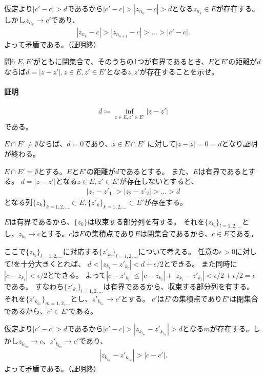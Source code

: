 仮定より$|c'-c|>d$であるから$|c'-c|>|z_{n_k}-c|>d$となる$z_{n_k}\in E$が存在する。しかし$z_{n_k}\longrightarrow c'$であり、
\begin{align*}
    |z_{n_k}-c|>|z_{n_{k+1}}-c|>\dots>|c'-c|.
\end{align*}
よって矛盾である。（証明終）

\begin{mysimplebox}{問6}
    $E, E'$がともに閉集合で、そのうちの1つが有界であるとき、$E$と$E'$の距離が$d$ならば$d=|z-z'|, z\in E, z'\in E'$となる$z, z'$が存在することを示せ。
\end{mysimplebox}
\paragraph{証明}
\begin{align*}
    d\coloneqq \inf_{z\in E, z'\in E'}|z-z'|
\end{align*}
である。

$E\cap E'\neq \emptyset$ならば、$d=0$であり、$z\in E\cap E'$
に対して$|z-z|=0=d$となり証明が終わる。

$E\cap E'=\emptyset$とする。$E$と$E'$の距離が$d$であるとする。
また、$E$は有界であるとする。
$d=|z-z'|$となる$z\in E, z'\in E'$が存在しないとすると、
\begin{align*}
    |z_1-z'_1|>|z_2-z'_2|>\dots>d
\end{align*}
となる列$\{z_k\}_{k=1,2,\dots}\subset E, \{z'_k\}_{k=1,2,\dots}\subset E'$が存在する。

$E$は有界であるから、$\{z_k\}$は収束する部分列を有する。
それを$\{z_{k_l}\}_{l=1,2,\dots}$とし、$z_{k_l}\longrightarrow c$とする。$c$は$E$の集積点であり$E$は閉集合であるから、$c\in E$である。

ここで$\{z_{k_l}\}_{l=1,2,\dots}$に対応する$\{z'_{k_l}\}_{l=1,2,\dots}$について考える。
任意の$\epsilon>0$に対して$l$を十分大きくとれば、
$d<|z_{k_l}-z'_{k_l}|<d+\epsilon/2$とできる。
また同時に$|c-z_{k_l}|<\epsilon/2$とできる。
よって$|c-z'_{k_l}|\le|c-z_{k_l}|+|z_{k_l}-z'_{k_l}|<\epsilon/2+\epsilon/2=\epsilon$である。
すなわち$\{z'_{k_l}\}_{l=1,2,\dots}$は有界であるから、収束する部分列を有する。
それを$\{z'_{k_{l_m}}\}_{m=1,2,\dots}$とし、$z'_{k_{l_m}}\rightarrow c'$とする。
$c'$は$E'$の集積点であり$E'$は閉集合であるから、$c'\in E'$である。

仮定より$|c'-c|>d$であるから$|c'-c|>|z_{k_{l_m}}-z'_{k_{l_m}}|>d$となる$m$が存在する。しかし$z_{k_{l_m}}\longrightarrow c$、$z'_{k_{l_m}}\longrightarrow c'$であり、
\begin{align*}
    |z_{k_{l_m}}-z'_{k_{l_m}}|>|c-c'|.
\end{align*}
よって矛盾である。（証明終）

